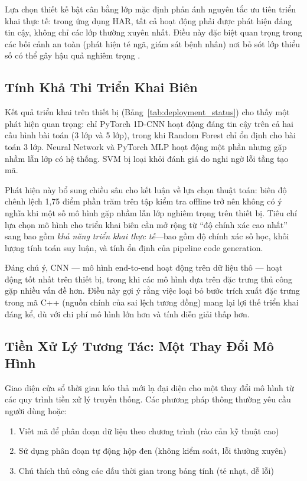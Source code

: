 Lựa chọn thiết kế bật cân bằng lớp mặc định phản ánh nguyên tắc ưu tiên triển khai thực tế: trong ứng dụng HAR, tất cả hoạt động phải được phát hiện đáng tin cậy, không chỉ các lớp thường xuyên nhất. Điều này đặc biệt quan trọng trong các bối cảnh an toàn (phát hiện té ngã, giám sát bệnh nhân) nơi bỏ sót lớp thiểu số có thể gây hậu quả nghiêm trọng \cite{he2009learning}.

\subsection{Tính Khả Thi Triển Khai Biên}
Kết quả triển khai trên thiết bị (Bảng~\ref{tab:deployment_status}) cho thấy một phát hiện quan trọng: chỉ PyTorch 1D-CNN hoạt động đáng tin cậy trên cả hai cấu hình bài toán (3 lớp và 5 lớp), trong khi Random Forest chỉ ổn định cho bài toán 3 lớp. Neural Network và PyTorch MLP hoạt động một phần nhưng gặp nhầm lẫn lớp có hệ thống. SVM bị loại khỏi đánh giá do nghi ngờ lỗi tầng tạo mã.

Phát hiện này bổ sung chiều sâu cho kết luận về lựa chọn thuật toán: biên độ chênh lệch 1,75 điểm phần trăm trên tập kiểm tra offline trở nên không có ý nghĩa khi một số mô hình gặp nhầm lẫn lớp nghiêm trọng trên thiết bị. Tiêu chí lựa chọn mô hình cho triển khai biên cần mở rộng từ ``độ chính xác cao nhất'' sang bao gồm \textit{khả năng triển khai thực tế}---bao gồm độ chính xác số học, khối lượng tính toán suy luận, và tính ổn định của pipeline code generation.

Đáng chú ý, CNN --- mô hình end-to-end hoạt động trên dữ liệu thô --- hoạt động tốt nhất trên thiết bị, trong khi các mô hình dựa trên đặc trưng thủ công gặp nhiều vấn đề hơn. Điều này gợi ý rằng việc loại bỏ bước trích xuất đặc trưng trong mã C++ (nguồn chính của sai lệch tương đồng) mang lại lợi thế triển khai đáng kể, dù với chi phí mô hình lớn hơn và tính diễn giải thấp hơn.

\subsection{Tiền Xử Lý Tương Tác: Một Thay Đổi Mô Hình}
Giao diện cửa sổ thời gian kéo thả mới lạ đại diện cho một thay đổi mô hình từ các quy trình tiền xử lý truyền thống. Các phương pháp thông thường yêu cầu người dùng hoặc:
\begin{enumerate}
    \item Viết mã để phân đoạn dữ liệu theo chương trình (rào cản kỹ thuật cao)
    \item Sử dụng phân đoạn tự động hộp đen (không kiểm soát, lỗi thường xuyên)
    \item Chú thích thủ công các dấu thời gian trong bảng tính (tẻ nhạt, dễ lỗi)
\end{enumerate}

